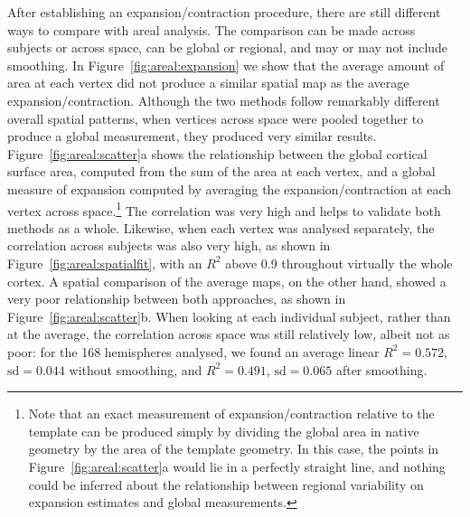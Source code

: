 After establishing an expansion/contraction procedure, there are still different ways to compare with areal analysis. The comparison can be made across subjects or across space, can be global or regional, and may or may not include smoothing. In Figure~\ref{fig:areal:expansion} we show that the average amount of area at each vertex did not produce a similar spatial map as the average expansion/contraction. Although the two methods follow remarkably different overall spatial patterns, when vertices across space were pooled together to produce a global measurement, they produced very similar results. Figure~\ref{fig:areal:scatter}a shows the relationship between the global cortical surface area, computed from the sum of the area at each vertex, and a global measure of expansion computed by averaging the expansion/contraction at each vertex across space.\footnote{Note that an exact measurement of expansion/contraction relative to the template can be produced simply by dividing the global area in native geometry by the area of the template geometry. In this case, the points in Figure~\ref{fig:areal:scatter}a would lie in a perfectly straight line, and nothing could be inferred about the relationship between regional variability on expansion estimates and global measurements.} The correlation was very high and helps to validate both methods as a whole. Likewise, when each vertex was analysed separately, the correlation across subjects was also very high, as shown in Figure~\ref{fig:areal:spatialfit}, with an $R^2$ above 0.9 throughout virtually the whole cortex. A spatial comparison of the average maps, on the other hand, showed a very poor relationship between both approaches, as shown in Figure~\ref{fig:areal:scatter}b. When looking at each individual subject, rather than at the average, the correlation across space was still relatively low, albeit not as poor: for the 168 hemispheres analysed, we found an average linear $R^2=0.572$, $\text{sd}=0.044$ without smoothing, and $R^2=0.491$, $\text{sd}=0.065$ after smoothing.

